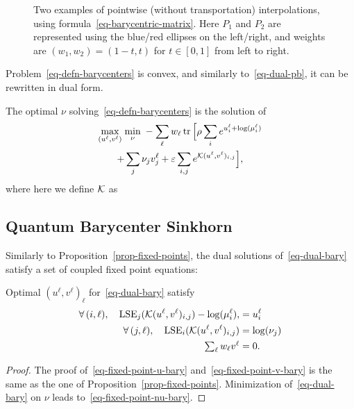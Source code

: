 \begin{figure}\centering
{}
\caption{Two examples of pointwise (without transportation) interpolations, using formula~\eqref{eq-barycentric-matrix}. Here $P_1$ and $P_2$ are represented using the blue/red ellipses on the left/right, and weights are $(w_1,w_2)=(1-t,t)$ for $t \in [0,1]$ from left to right.} \label{fig:interp}
\end{figure}






Problem~\eqref{eq-defn-barycenters} is convex, and similarly to~\eqref{eq-dual-pb}, it can be rewritten in dual form.

\begin{prop}
The optimal $\nu$ solving~\eqref{eq-defn-barycenters} is the solution of
\begin{multline}\label{eq-dual-bary}		
		\underset{(u^\ell,v^\ell)}{\max}\; \underset{\nu}{\min}\;
				- 
				\sum_\ell w_\ell 
					\operatorname{tr}\Big[
						\rho \sum_i e^{u_i^\ell+\log(\mu_i^\ell)} \\
					+    \sum_j \nu_j v_j^\ell
					+    \varepsilon \sum_{i,j}  e^{ \mathcal{K}(u^\ell,v^\ell)_{i,j} }
			 \Big], 
\end{multline}	
 where here we define $\mathcal{K}$ as
\end{prop}





\subsection{Quantum Barycenter Sinkhorn}

Similarly to Proposition~\ref{prop-fixed-points}, the dual solutions of~\eqref{eq-dual-bary} satisfy a set of coupled fixed point equations:

\begin{prop}
Optimal $(u^\ell,v^\ell)_\ell$ for~\eqref{eq-dual-bary} satisfy 
\begin{align}
	\forall \, (i,\ell), \quad \operatorname{LSE}_j(\mathcal{K}(u^\ell,v^\ell)_{i,j})-\log(\mu_i^\ell), \label{eq-fixed-point-u-bary} 
		&= u_i^\ell \\
	\forall \, (j,\ell), \quad \operatorname{LSE}_i(\mathcal{K}(u^\ell,v^\ell)_{i,j}) \label{eq-fixed-point-v-bary}
		&= \log(\nu_j)\\ 
		 \textstyle \sum_\ell w_\ell v^\ell &= 0. \label{eq-fixed-point-nu-bary}
\end{align}
\end{prop}
\begin{proof}
The proof of~\eqref{eq-fixed-point-u-bary} and~\eqref{eq-fixed-point-v-bary} is the same as the one of Proposition~\ref{prop-fixed-points}.
Minimization of~\eqref{eq-dual-bary} on $\nu$ leads to~\eqref{eq-fixed-point-nu-bary}. 
\end{proof}


